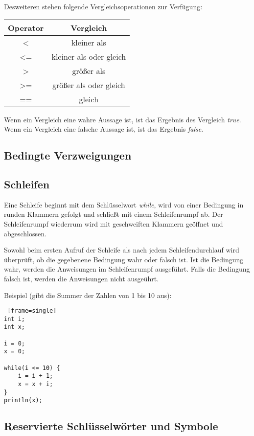 Desweiteren stehen folgende Vergleichsoperationen zur Verfügung:
\begin{center}
  \begin{tabular}{ | c | c | }
    \hline
    Operator & Vergleich\\ \hline \hline
    < & kleiner als\\ \hline
    <= & kleiner als oder gleich\\ \hline
    > & größer als\\ \hline
    >= & größer als oder gleich\\ \hline    
    == & gleich\\ \hline    
  \end{tabular}
\end{center}
Wenn ein Vergleich eine wahre Aussage ist, ist das Ergebnis des Vergleich \textit{true}.
Wenn ein Vergleich eine falsche Aussage ist, ist das Ergebnis \textit{false}.

\subsection{Bedingte Verzweigungen}


\subsection{Schleifen}
Eine Schleife beginnt mit dem Schlüsselwort \textit{while}, wird von einer Bedingung in runden Klammern gefolgt und schließt mit einem Schleifenrumpf ab. Der Schleifenrumpf wiederrum wird mit geschweiften Klammern geöffnet und abgeschlossen.

Sowohl beim ersten Aufruf der Schleife als nach jedem Schleifendurchlauf wird überprüft, ob die gegebenene Bedingung wahr oder falsch ist. Ist die Bedingung wahr, werden die Anweisungen im Schleifenrumpf ausgeführt. Falls die Bedingung falsch ist, werden die Anweisungen nicht ausgeührt.

Beispiel (gibt die Summer der Zahlen von 1 bis 10 aus):
\begin{lstlisting} [frame=single] 
int i;
int x;

i = 0;
x = 0;

while(i <= 10) {
	i = i + 1;
	x = x + i;
}
println(x);
\end{lstlisting}
	
\subsection{Reservierte Schlüsselwörter und Symbole}	

